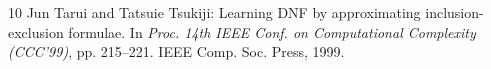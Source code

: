 \begin{thebibliography}{10}
{\sc Jun Tarui and Tatsuie Tsukiji}: Learning {DNF} by approximating
  inclusion-exclusion formulae.
\newblock In {\em Proc. 14th IEEE Conf. on Computational Complexity (CCC'99)},
  pp. 215--221. IEEE Comp. Soc. Press, 1999.

\end{thebibliography}

